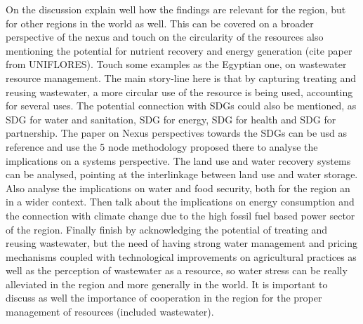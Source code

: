 On the discussion  explain well how the findings are relevant for the region, but for other regions in the world as well. This can be covered on a broader perspective of the nexus and touch on the circularity of the resources also mentioning the potential for nutrient recovery and energy generation (cite paper from UNIFLORES). Touch some examples as the Egyptian one, on wastewater resource management. The main story-line here is that by capturing treating and reusing wastewater, a more circular use of the resource is being used, accounting for several uses. The potential connection with SDGs could also be mentioned, as SDG for water and sanitation, SDG for energy, SDG for health and SDG for partnership. The paper on Nexus perspectives towards the SDGs can be usd as reference and use the 5 node methodology proposed there to analyse the implications on a systems perspective. The land use and water recovery systems can be analysed, pointing at the interlinkage between land use and water storage. Also analyse the implications on water and food security, both for the region an in a wider context. Then talk about the implications on energy consumption and the connection with climate change due to the high fossil fuel based power sector of the region. Finally finish by acknowledging the potential of treating and reusing wastewater, but the need of having strong water management and pricing mechanisms coupled with technological improvements on agricultural practices as well as the perception of wastewater as a resource, so water stress can be really alleviated in the region and more generally in the world. It is important to discuss as well the importance of cooperation in the region for the proper management of resources (included wastewater).